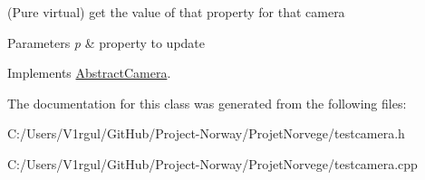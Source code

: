 (Pure virtual) get the value of that property for that camera 


\begin{DoxyParams}{Parameters}
{\em p} & property to update \\
\hline
\end{DoxyParams}


Implements \hyperlink{class_abstract_camera_acb48ab701cd02e78604a3ca1c695b1cf}{Abstract\-Camera}.



The documentation for this class was generated from the following files\-:\begin{DoxyCompactItemize}
\item 
C\-:/\-Users/\-V1rgul/\-Git\-Hub/\-Project-\/\-Norway/\-Projet\-Norvege/testcamera.\-h\item 
C\-:/\-Users/\-V1rgul/\-Git\-Hub/\-Project-\/\-Norway/\-Projet\-Norvege/testcamera.\-cpp\end{DoxyCompactItemize}
